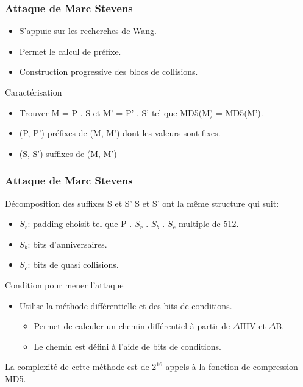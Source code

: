 	\begin{frame}
		\frametitle{Attaque de Marc Stevens}
		\begin{block}{}
		  \begin{itemize}
		  \item S'appuie sur les recherches de Wang.
		  \item Permet le calcul de pr\'efixe.
		  \item Construction progressive des blocs de collisions.
		  \end{itemize}
		\end{block}
	
		\begin{block}{Caract\'erisation}
		  \begin{itemize}
		  \item Trouver M = P . S et  M' = P' . S' tel que MD5(M) = MD5(M').
		  \item (P, P') pr\'efixes de (M, M') dont les valeurs sont fixes.
		  \item (S, S') suffixes de (M, M')
		  \end{itemize}
		\end{block}
	\end{frame}

	
	\begin{frame}
		\frametitle{Attaque de Marc Stevens}
		\begin{block}{D\'ecomposition des suffixes S et S'}
		S et S' ont la m\^eme structure qui suit:
		  \begin{itemize}
		  \item $S_r$: padding choisit tel que P . $S_r$ . $S_b$ . $S_c$ multiple de 512.
		  \item $S_b$: bits d'anniversaires.
		  \item $S_c$: bits de quasi collisions.
		  \end{itemize}
		\end{block}
		
		\begin{block}{Condition pour mener l'attaque}
		  \begin{itemize}
		  \item Utilise la m\'ethode diff\'erentielle et des bits de conditions.
		    \begin{itemize}
		    \item Permet de calculer un chemin diff\'erentiel \`a partir de $\Delta$IHV et $\Delta$B.
		    \item Le chemin est d\'efini \`a l'aide de bits de conditions.
		    \end{itemize}
		  \end{itemize}
		  
		  La complexité de cette m\'ethode est de $2^{16}$ appels \`a la fonction de compression MD5.
		\end{block}
	\end{frame}
	
